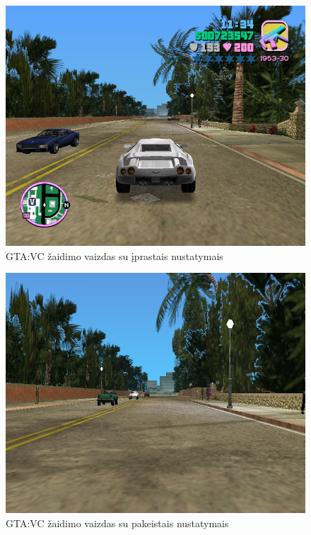 \documentclass{VUMIFPSkursinis}
\begin{document}
            \begin{figure}[H]
                \centering
                \includegraphics[scale=0.5]{img/neapdorotas_pvz}
                \caption{GTA:VC žaidimo vaizdas su įprastais nustatymais}
                \label{img:mlp}
            \end{figure}
            \begin{figure}[H]
                \centering
                \includegraphics[scale=0.5]{img/apdorotas_pvz}
                \caption{GTA:VC žaidimo vaizdas su pakeistais nustatymais}
                \label{img:mlp}
            \end{figure}
\end{document}
